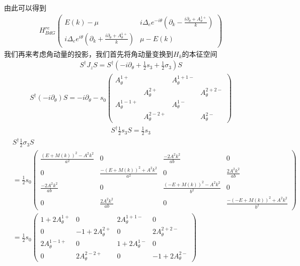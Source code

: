 \documentclass[22pt]{article}
\begin{document}
由此可以得到
\begin{align}
	H_{BdG}^{re}
	\begin{pmatrix}
		E(k)-\mu & i\Delta_ee^{-i\theta}(\partial_k-\frac{i\partial_{\theta}+A_{\theta}^{1+}}{k})\\
		i\Delta_ee^{i\theta}(\partial_k+\frac{i\partial_{\theta}+A_{\theta}^{1+}}{k}) & \mu-E(k)
	\end{pmatrix}
\end{align}
我们再来考虑角动量的投影，我们首先将角动量变换到$H_k$的本征空间
\begin{align}
	S^{\dagger}J_zS=S^{\dagger}(-i\partial_{\theta}+\frac{1}{2}s_3+\frac{1}{2}\sigma_3)S
\end{align}
\begin{align}
	S^{\dagger}(-i\partial_{\theta})S=-i\partial_{\theta}-s_0
	\begin{pmatrix}
		A_{\theta}^{1+} &&A_{\theta}^{1+1-}&\\
		&A_{\theta}^{2+}&&A_{\theta}^{2+2-}\\
		A_{\theta}^{1-1+}&&A_{\theta}^{1-}&\\
		&A_{\theta}^{2-2+}&&A_{\theta}^{2-}
	\end{pmatrix}
\end{align}
\begin{align}
	S^{\dagger}\frac{1}{2}s_3S=\frac{1}{2}s_3
\end{align}
\begin{align}
	&S^{\dagger}\frac{1}{2}\sigma_3S
	\\ \nonumber
	&=\frac{1}{2}s_0
	\begin{pmatrix}
		\frac{(E+M(k))^2-A^2k^2}{a^2} &0 & \frac{-2A^2k^2}{ab} &0	\\
		0&\frac{-(E+M(k))^2+A^2k^2}{a^2} &0 &\frac{2A^2k^2}{ab} \\
		\frac{-2A^2k^2}{ab} &0 &\frac{(-E+M(k))^2-A^2k^2}{b^2} &0\\
		0&\frac{2A^2k^2}{ab} &0 &\frac{-(-E+M(k))^2+A^2k^2}{b^2}
	\end{pmatrix}
	\\   \nonumber
	&=\frac{1}{2}s_0
	\begin{pmatrix}
		1+2A_{\theta}^{1+}  &0 &2A_{\theta}^{1+1-}&0\\
		0&-1+2A_{\theta}^{2+}&0&2A_{\theta}^{2+2-}\\
		2A_{\theta}^{1-1+} &0 &1+2A_{\theta}^{1-}&0\\
		0&2A_{\theta}^{2-2+} &0 &-1+2A_{\theta}^{2-}
	\end{pmatrix}
\end{align}
\end{document}
